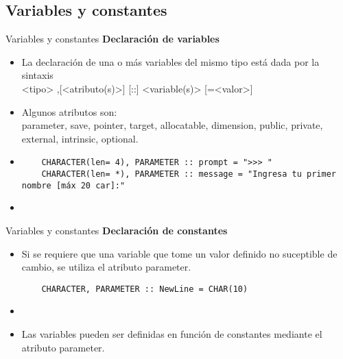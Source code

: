 
\subsection{Variables y constantes}

\begin{frame}[fragile]{Variables y constantes}
\textbf{Declaración de variables}
 \begin{itemize}[<+(0)->]
  \item La declaración de una o más variables del mismo tipo está dada por la sintaxis\\ 
   \centering <tipo> ,[<atributo(s)>] [::] <variable(s)> [=<valor>]
  \item Algunos atributos son:\\ 
  parameter, save, pointer, target, allocatable, dimension, public, private, external, intrinsic, optional.
  \vspace{6pt}
  \item []
   \begin{verbatim}
    CHARACTER(len= 4), PARAMETER :: prompt = ">>> "
    CHARACTER(len= *), PARAMETER :: message = "Ingresa tu primer nombre [máx 20 car]:"
   \end{verbatim}
  \item[] 
 \end{itemize}
\end{frame}

\begin{frame}[fragile]{Variables y constantes}
\textbf{Declaración de constantes}
 \begin{itemize}[<+(0)->]
  \item Si se requiere que una variable que tome un valor definido no suceptible de cambio, se utiliza el atributo parameter. \\ 
   \begin{verbatim}
    CHARACTER, PARAMETER :: NewLine = CHAR(10)
   \end{verbatim}
   \item[] 
   \vspace{-3pt}
   \item Las variables pueden ser definidas en función de constantes mediante el atributo parameter.
 \end{itemize}
\end{frame}
